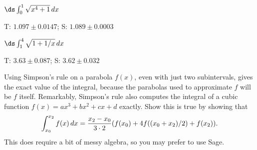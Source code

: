 \begin{enumialphparenastyle}
\begin{ex}
 $\ds\int_0^1 \sqrt{x^4+1}\,dx$
\begin{sol}
 T: $1.097\pm 0.0147$; S: $1.089\pm 0.0003$
\end{sol}
\end{ex}

\begin{ex}
 $\ds\int_1^4 \sqrt{1+1/x}\,dx$
\begin{sol}
 T: $3.63\pm 0.087$; S: $3.62\pm 0.032$
\end{sol}
\end{ex}

\begin{ex}
 Using Simpson's rule on a parabola $f(x)$, even with just
two subintervals, gives the exact value of the integral, because the
parabolas used to approximate $f$ will be $f$ itself. Remarkably,
Simpson's rule also computes the integral of a cubic function
$f(x)=ax^3+bx^2+cx+d$ exactly. Show this is true by showing that
$$
  \int_{x_0}^{x_2}
  f(x)\,dx={x_2-x_0\over3\cdot2}(f(x_0)+4f((x_0+x_2)/2)+f(x_2)).
$$
This does require a bit of messy algebra, so you may prefer to use Sage.
\end{ex}

\end{enumialphparenastyle}